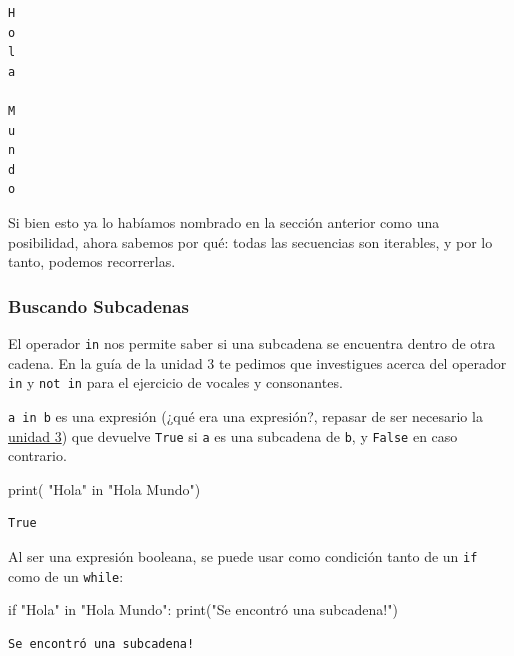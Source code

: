 \documentclass[
  letterpaper,
  DIV=11,
  numbers=noendperiod]{scrreprt}
\newenvironment{Shaded}{\begin{snugshade}}{\end{snugshade}}
\newcommand{\BuiltInTok}[1]{\textcolor[rgb]{0.00,0.23,0.31}{#1}}
\newcommand{\ControlFlowTok}[1]{\textcolor[rgb]{0.00,0.23,0.31}{#1}}
\newcommand{\KeywordTok}[1]{\textcolor[rgb]{0.00,0.23,0.31}{#1}}
\newcommand{\NormalTok}[1]{\textcolor[rgb]{0.00,0.23,0.31}{#1}}
\newcommand{\StringTok}[1]{\textcolor[rgb]{0.13,0.47,0.30}{#1}}
\begin{document}
\begin{verbatim}
H
o
l
a
 
M
u
n
d
o
\end{verbatim}

Si bien esto ya lo habíamos nombrado en la sección anterior como una
posibilidad, ahora sabemos por qué: todas las secuencias son iterables,
y por lo tanto, podemos recorrerlas.

\hypertarget{buscando-subcadenas}{%
\subsubsection{Buscando Subcadenas}\label{buscando-subcadenas}}

El operador \texttt{in} nos permite saber si una subcadena se encuentra
dentro de otra cadena. En la guía de la unidad 3 te pedimos que
investigues acerca del operador \texttt{in} y \texttt{not\ in} para el
ejercicio de vocales y consonantes.

\texttt{a\ in\ b} es una expresión (¿qué era una expresión?, repasar de
ser necesario la \protect\hyperlink{expresiones-booleanas}{unidad 3})
que devuelve \texttt{True} si \texttt{a} es una subcadena de \texttt{b},
y \texttt{False} en caso contrario.

\begin{Shaded}
\begin{Highlighting}[]
\BuiltInTok{print}\NormalTok{( }\StringTok{"Hola"} \KeywordTok{in} \StringTok{"Hola Mundo"}\NormalTok{)}
\end{Highlighting}
\end{Shaded}

\begin{verbatim}
True
\end{verbatim}

Al ser una expresión booleana, se puede usar como condición tanto de un
\texttt{if} como de un \texttt{while}:

\begin{Shaded}
\begin{Highlighting}[]
\ControlFlowTok{if} \StringTok{"Hola"} \KeywordTok{in} \StringTok{"Hola Mundo"}\NormalTok{:}
    \BuiltInTok{print}\NormalTok{(}\StringTok{"Se encontró una subcadena!"}\NormalTok{)}
\end{Highlighting}
\end{Shaded}

\begin{verbatim}
Se encontró una subcadena!
\end{verbatim}
\end{document}
